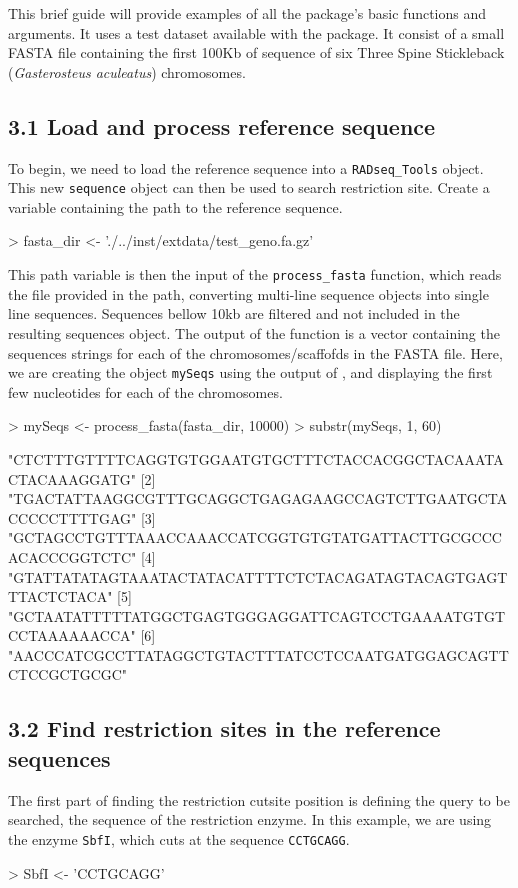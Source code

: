 \documentclass{article}
\begin{document}
This brief guide will provide examples of all the package's basic functions and arguments. It uses a test dataset available with the package. It consist of a small FASTA file containing the first 100Kb of sequence of six Three Spine Stickleback (\emph{Gasterosteus aculeatus}) chromosomes.

\subsection*{3.1  Load and process reference sequence}

To begin, we need to load the reference sequence into a \texttt{RADseq\_Tools} object. This new \texttt{sequence} object can then be used to search restriction site. Create a variable containing the path to the reference sequence.  
\begin{Schunk}
\begin{Sinput}
> fasta_dir <- './../inst/extdata/test_geno.fa.gz'
\end{Sinput}
\end{Schunk}
This path variable is then the input of the \texttt{process\_fasta} function, which reads the file provided in the path, converting multi-line sequence objects into single line sequences. Sequences bellow 10kb are filtered and not included in the resulting sequences object. The output of the function is a vector containing the sequences strings for each of the chromosomes/scaffofds in the FASTA file. Here, we are creating the object \texttt{mySeqs} using the output of , and displaying the first few nucleotides for each of the chromosomes. 
\begin{Schunk}
\begin{Sinput}
> mySeqs <- process_fasta(fasta_dir, 10000)
> substr(mySeqs, 1, 60)
\end{Sinput}
\begin{Soutput}
[1] "CTCTTTGTTTTCAGGTGTGGAATGTGCTTTCTACCACGGCTACAAATACTACAAAGGATG"
[2] "TGACTATTAAGGCGTTTGCAGGCTGAGAGAAGCCAGTCTTGAATGCTACCCCCTTTTGAG"
[3] "GCTAGCCTGTTTAAACCAAACCATCGGTGTGTATGATTACTTGCGCCCACACCCGGTCTC"
[4] "GTATTATATAGTAAATACTATACATTTTCTCTACAGATAGTACAGTGAGTTTACTCTACA"
[5] "GCTAATATTTTTATGGCTGAGTGGGAGGATTCAGTCCTGAAAATGTGTCCTAAAAAACCA"
[6] "AACCCATCGCCTTATAGGCTGTACTTTATCCTCCAATGATGGAGCAGTTCTCCGCTGCGC"
\end{Soutput}
\end{Schunk}

\subsection*{3.2  Find restriction sites in the reference sequences}
The first part of finding the restriction cutsite position is defining the query to be searched, the sequence of the restriction enzyme. In this example, we are using the enzyme \texttt{SbfI}, which cuts at the sequence \texttt{CCTGCAGG}.
\begin{Schunk}
\begin{Sinput}
> SbfI <- 'CCTGCAGG'
\end{Sinput}
\end{Schunk}
\end{document}
